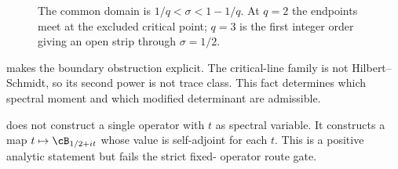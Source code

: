 \begin{figure}[t]
\centering

\caption{The common domain is
$1/q<\sigma<1-1/q$.  At $q=2$ the endpoints meet at the excluded
critical point; $q=3$ is the first integer order giving an open strip
through $\sigma=1/2$.}
\label{fig:strip}
\end{figure}

 makes the boundary obstruction explicit.  The
critical-line family is not Hilbert--Schmidt, so its second power is
not trace class.  This fact determines which spectral moment and which
modified determinant are admissible.

\begin{remark}
\label{rem:family}
 does not construct a single operator with $t$
as spectral variable.  It constructs a map
$t\mapsto\cB_{1/2+it}$ whose value is self-adjoint for each $t$.
This is a positive analytic statement but fails the strict fixed-
operator route gate.
\end{remark}
